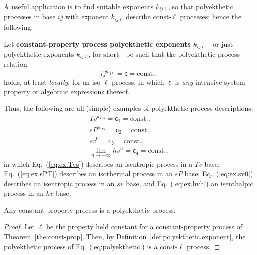     A useful application is to  find  suitable  exponents  $k_{ij\ell}$,  so  that  polyekthetic
    processes in base $ij$ with exponent $k_{ij\ell}$ describe const-$\ell$ processes; hence the
    following:

    \begin{definition}\label{def:polyekthetic.exponent}
        Let \textbf{constant-property process  polyekthetic  exponents  $k_{ij\ell}$}---or  just
        polyekthetic exponents $k_{ij\ell}$, for short---be such that the  polyekthetic  process
        relation
        \begin{equation}
            ij^{k_{ij\ell}} = \mathsf{c} = \mbox{const.},
            \label{eq:polyekthetic}
        \end{equation}
        \noindent holds, at least \emph{locally}, for an iso-$\ell$ process, in which $\ell$  is
        \emph{any} intensive system property or algebraic expressions thereof.
    \end{definition}

    Thus, the following are all (simple) examples of polyekthetic process descriptions:
    \begin{align}
        Tv^{k_{Tvs}} = \mathsf{c_1} = \mbox{const.}, \label{eq:ex.Tvs} \\
        sP^{k_{sPT}} = \mathsf{c_2} = \mbox{const.}, \label{eq:ex.sPT} \\
        sv^0 = \mathsf{c_3} = \mbox{const.}, \label{eq:ex.sv0} \\
        \lim_{n \to +\infty}hv^n = \mathsf{c_4} = \mbox{const.}, \label{eq:ex.hvh}
    \end{align}
    \noindent in which Eq.~(\ref{eq:ex.Tvs}) describes an isentropic process  in  a  $Tv$  base;
    Eq.~(\ref{eq:ex.sPT}) describes an isothermal process in an $sP$ base; Eq.~(\ref{eq:ex.sv0})
    describes an isentropic process in an $sv$ base, and  Eq.~(\ref{eq:ex.hvh})  an  isenthalpic
    process in an $hv$ base.

    \begin{theorem}\label{the:const-prop}
        Any constant-property process is a polyekthetic process.
    \end{theorem}

    \begin{proof}
        Let  $\ell$  be  the  property  held  constant  for  a  constant-property   process   of
        Theorem~\ref{the:const-prop}. Then, by  Definition~\ref{def:polyekthetic.exponent},  the
        polyekthetic process of Eq.~(\ref{eq:polyekthetic}) is a const-$\ell$ process.
    \end{proof}

